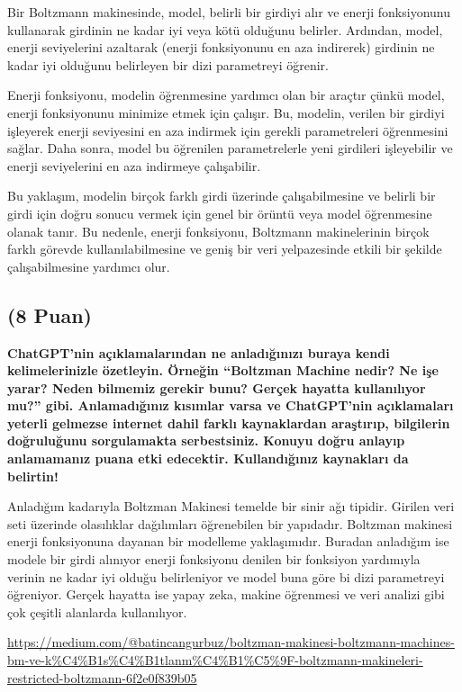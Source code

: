 \documentclass[11pt]{article}
\begin{document}
Bir Boltzmann makinesinde, model, belirli bir girdiyi alır ve enerji fonksiyonunu kullanarak girdinin ne kadar iyi veya kötü olduğunu belirler. Ardından, model, enerji seviyelerini azaltarak (enerji fonksiyonunu en aza indirerek) girdinin ne kadar iyi olduğunu belirleyen bir dizi parametreyi öğrenir.

Enerji fonksiyonu, modelin öğrenmesine yardımcı olan bir araçtır çünkü model, enerji fonksiyonunu minimize etmek için çalışır. Bu, modelin, verilen bir girdiyi işleyerek enerji seviyesini en aza indirmek için gerekli parametreleri öğrenmesini sağlar. Daha sonra, model bu öğrenilen parametrelerle yeni girdileri işleyebilir ve enerji seviyelerini en aza indirmeye çalışabilir.

Bu yaklaşım, modelin birçok farklı girdi üzerinde çalışabilmesine ve belirli bir girdi için doğru sonucu vermek için genel bir örüntü veya model öğrenmesine olanak tanır. Bu nedenle, enerji fonksiyonu, Boltzmann makinelerinin birçok farklı görevde kullanılabilmesine ve geniş bir veri yelpazesinde etkili bir şekilde çalışabilmesine yardımcı olur.



\subsection{(8 Puan)} \textbf{ChatGPT’nin açıklamalarından ne anladığınızı buraya kendi kelimelerinizle özetleyin. Örneğin ``Boltzman Machine nedir? Ne işe yarar? Neden bilmemiz gerekir bunu? Gerçek hayatta kullanılıyor mu?'' gibi. Anlamadığınız kısımlar varsa ve ChatGPT’nin açıklamaları yeterli gelmezse internet dahil farklı kaynaklardan araştırıp, bilgilerin doğruluğunu sorgulamakta serbestsiniz. Konuyu doğru anlayıp anlamamanız puana etki edecektir. Kullandığınız kaynakları da belirtin!}

Anladığım kadarıyla Boltzman Makinesi temelde bir sinir ağı tipidir. Girilen veri seti üzerinde olasılıklar dağılımları öğrenebilen bir yapıdadır. Boltzman makinesi enerji fonksiyonuna dayanan bir modelleme yaklaşımıdır. Buradan anladığım ise modele bir girdi alınıyor enerji fonksiyonu denilen bir fonksiyon yardımıyla verinin ne kadar iyi olduğu belirleniyor ve model buna göre bi dizi parametreyi öğreniyor. Gerçek hayatta ise yapay zeka, makine öğrenmesi ve veri analizi gibi çok çeşitli alanlarda kullanılıyor. 

\url{https://medium.com/@batincangurbuz/boltzman-makinesi-boltzmann-machines-bm-ve-k%C4%B1s%C4%B1tlanm%C4%B1%C5%9F-boltzmann-makineleri-restricted-boltzmann-6f2e0f839b05}
\end{document}
